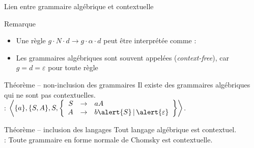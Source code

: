 
\begingroup


\begin{frame}{Lien entre grammaire algébrique et contextuelle}
  \begin{block}{Remarque}
    \begin{itemize}
    \item Une règle $g \cdot N \cdot d \rightarrow g \cdot \alpha \cdot d$ peut être interprétée comme :\\ \og {} \fg
    \item Les grammaires algébriques sont souvent appelées  (\textit{context-free}), car $g = d = \varepsilon$ pour toute règle
    \end{itemize}
  \end{block}

  \begin{block}{Théorème -- non-inclusion des grammaires}
    Il existe des grammaires algébriques qui ne sont pas contextuelles. \\
     : $\left\langle \{a\}, \{S, A\}, S, \left\{\begin{array}{rcl} S &\rightarrow & aA \\ A &\rightarrow & b\alert{S} \,|\, \alert{\varepsilon} \end{array}\right\} \right\rangle$.
  \end{block}

  \begin{block}{Théorème -- inclusion des langages}
    Tout langage algébrique est contextuel.\\
     : Toute grammaire en forme normale de Chomsky est contextuelle. 
  \end{block}
\end{frame}

\endgroup
